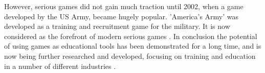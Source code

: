 \documentclass[a4paper,11.5pt]{report}
\numberwithin{figure}{section}
\numberwithin{table}{section}
\numberwithin{equation}{section}
\numberwithin{equation}{section}
\begin{document}
However, serious games did not gain much traction until 2002, when a game developed by the US Army, became hugely popular. 'America's Army' was developed as a training and recruitment game for the military. It is now considered as the forefront of modern serious games \citep{Zyda2005, Wilkinson2016}. In conclusion the potential of using games as educational tools has been demonstrated for a long time, and is now being further researched and developed, focusing on training and education in a number of different industries \citep{Wilkinson2016}.


 






\end{document}
